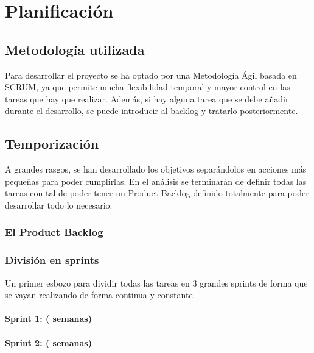 \chapter{Planificación}

\noindent{}

\section{Metodología utilizada}
Para desarrollar el proyecto se ha optado por una Metodología Ágil basada en SCRUM, ya que permite mucha flexibilidad temporal y mayor control en las tareas que hay que realizar. Además, si hay alguna tarea que se debe añadir durante el desarrollo, se puede introducir al backlog y tratarlo posteriormente.

\section{Temporización}
A grandes rasgos, se han desarrollado los objetivos separándolos en acciones más pequeñas para poder cumplirlas. En el análisis se terminarán de definir todas las tareas con tal de poder tener un Product Backlog definido totalmente para poder desarrollar todo lo necesario.

\subsection{El Product Backlog}

\subsection{División en sprints}
Un primer esbozo para dividir todas las tareas en 3 grandes sprints de forma que se vayan realizando de forma continua y constante.

\subsubsection{Sprint 1: ( semanas)}

\subsubsection{Sprint 2: ( semanas)}

